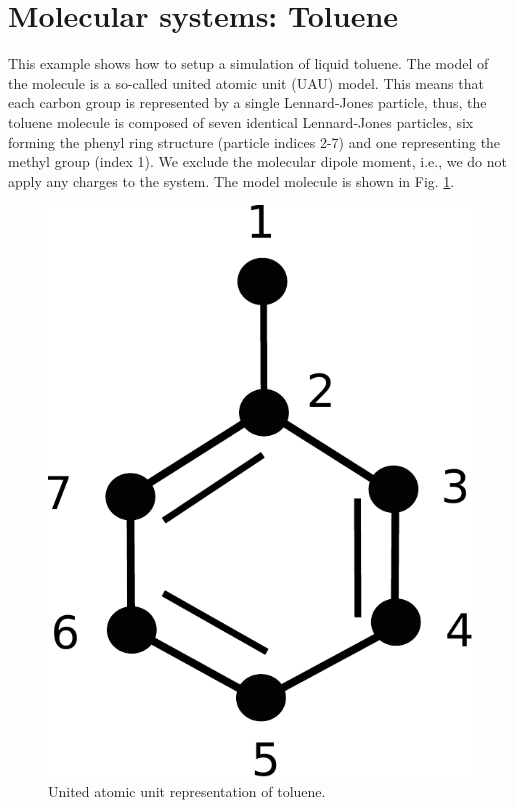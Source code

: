 \documentclass[11pt]{article}
\begin{document}
\section{Molecular systems: Toluene}
This example shows how to setup a simulation of liquid toluene. The model
of the molecule is a so-called united atomic unit (UAU) model. This means that
each carbon group is represented by a single Lennard-Jones particle, thus, the
toluene molecule is composed of seven identical Lennard-Jones particles, six
forming the phenyl ring structure (particle indices 2-7) and one representing
the methyl group (index 1).  We exclude the molecular dipole moment, i.e., we do
not apply any charges to the system. The model molecule is shown in
Fig. \ref{fig:toluene}.
\begin{figure}[h]
  \begin{center}
    \includegraphics[scale=.4]{toluene.pdf}
  \caption{
    \label{fig:toluene}
    United atomic unit representation of toluene.
  }
  \end{center}
\end{figure}
\end{document}

